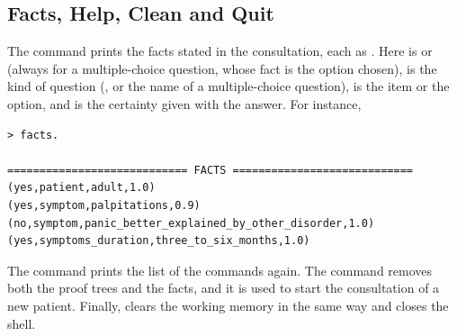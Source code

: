 \subsection{Facts, Help, Clean and Quit}

The command  prints the facts stated in the consultation, each as
. Here  is  or
 (always  for a multiple-choice question, whose fact is the
option chosen),  is the kind of question (, or the
name of a multiple-choice question),  is the item or the option, and
 is the certainty given with the answer. For instance,
\begin{lstlisting}
> facts.

============================ FACTS ============================
(yes,patient,adult,1.0)
(yes,symptom,palpitations,0.9)
(no,symptom,panic_better_explained_by_other_disorder,1.0)
(yes,symptoms_duration,three_to_six_months,1.0)
\end{lstlisting}
The command  prints the list of the commands again. The command
 removes both the proof trees and the facts, and it is used to start
the consultation of a new patient. Finally,  clears the working
memory in the same way and closes the shell.
